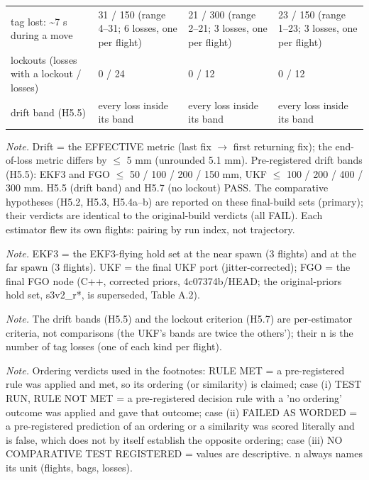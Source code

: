 \begin{table}[htbp]
\begin{tabular}{p{}p{}p{}p{}}
tag lost: \textasciitilde{}7 s during a move & 31 / 150 (range 4--31; 6 losses, one per flight) & 21 / 300 (range 2--21; 3 losses, one per flight) & 23 / 150 (range 1--23; 3 losses, one per flight) \\
lockouts (losses with a lockout / losses) & 0 / 24 & 0 / 12 & 0 / 12 \\
drift band (H5.5) & every loss inside its band & every loss inside its band & every loss inside its band \\
\bottomrule
\end{tabular}
\par\smallskip\raggedright
\textit{Note.} Drift = the EFFECTIVE metric (last fix $\rightarrow$ first returning fix); the end-of-loss metric differs by $\le$ 5 mm (unrounded 5.1 mm). Pre-registered drift bands (H5.5): EKF3 and FGO $\le$ 50 / 100 / 200 / 150 mm, UKF $\le$ 100 / 200 / 400 / 300 mm. H5.5 (drift band) and H5.7 (no lockout) PASS. The comparative hypotheses (H5.2, H5.3, H5.4a--b) are reported on these final-build sets (primary); their verdicts are identical to the original-build verdicts (all FAIL). Each estimator flew its own flights: pairing by run index, not trajectory.\par
\textit{Note.} EKF3 = the EKF3-flying hold set at the near spawn (3 flights) and at the far spawn (3 flights). UKF = the final UKF port (jitter-corrected); FGO = the final FGO node (C++, corrected priors, 4c07374b/HEAD; the original-priors hold set, s3v2\_r*, is superseded, Table A.2).\par
\textit{Note.} The drift bands (H5.5) and the lockout criterion (H5.7) are per-estimator criteria, not comparisons (the UKF's bands are twice the others'); their n is the number of tag losses (one of each kind per flight).\par
\textit{Note.} Ordering verdicts used in the footnotes: RULE MET = a pre-registered rule was applied and met, so its ordering (or similarity) is claimed; case (i) TEST RUN, RULE NOT MET = a pre-registered decision rule with a 'no ordering' outcome was applied and gave that outcome; case (ii) FAILED AS WORDED = a pre-registered prediction of an ordering or a similarity was scored literally and is false, which does not by itself establish the opposite ordering; case (iii) NO COMPARATIVE TEST REGISTERED = values are descriptive. n always names its unit (flights, bags, losses).\par

\end{table}
